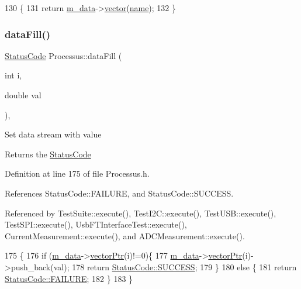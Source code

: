 \begin{DoxyCode}
130                                         \{
131     \textcolor{keywordflow}{return} \hyperlink{classProcessus_a3da9a9de8af54e2f47807a3e09dfccff}{m\_data}->\hyperlink{classData_a94e00cdd58c1d6f11487f1ac47fee4bc}{vector}(\hyperlink{classObject_a300f4c05dd468c7bb8b3c968868443c1}{name});
132   \}
\end{DoxyCode}
\mbox{\label{classProcessus_a0d093b48f3218a088ba030e24372f18c}} 
\subsubsection{\texorpdfstring{data\+Fill()}{dataFill()}\hspace{0.1cm}{\footnotesize\ttfamily [1/2]}}
{\footnotesize\ttfamily \hyperlink{classStatusCode}{Status\+Code} Processus\+::data\+Fill (\begin{DoxyParamCaption}\item[{int}]{i,  }\item[{double}]{val }\end{DoxyParamCaption})\hspace{0.3cm}{\ttfamily [inline]}, {\ttfamily [inherited]}}

Set data stream with value \begin{DoxyReturn}{Returns}
the \hyperlink{classStatusCode}{Status\+Code} 
\end{DoxyReturn}


Definition at line 175 of file Processus.\+h.



References Status\+Code\+::\+F\+A\+I\+L\+U\+RE, and Status\+Code\+::\+S\+U\+C\+C\+E\+SS.



Referenced by Test\+Suite\+::execute(), Test\+I2\+C\+::execute(), Test\+U\+S\+B\+::execute(), Test\+S\+P\+I\+::execute(), Usb\+F\+T\+Interface\+Test\+::execute(), Current\+Measurement\+::execute(), and A\+D\+C\+Measurement\+::execute().


\begin{DoxyCode}
175                                         \{
176     \textcolor{keywordflow}{if} (\hyperlink{classProcessus_a3da9a9de8af54e2f47807a3e09dfccff}{m\_data}->\hyperlink{classData_aa2153cb57f6f1a67b54eafe5582e0b6b}{vectorPtr}(i)!=0)\{
177       \hyperlink{classProcessus_a3da9a9de8af54e2f47807a3e09dfccff}{m\_data}->\hyperlink{classData_aa2153cb57f6f1a67b54eafe5582e0b6b}{vectorPtr}(i)->push\_back(val);
178       \textcolor{keywordflow}{return} \hyperlink{classStatusCode_a6f565cbeadc76d14c72f047e5e85eb4badd0da38d3ba0d922efd1f4619bc37ad8}{StatusCode::SUCCESS};
179     \}
180     \textcolor{keywordflow}{else} \{
181       \textcolor{keywordflow}{return} \hyperlink{classStatusCode_a6f565cbeadc76d14c72f047e5e85eb4ba3da73d4c469762eb9d3c960368252b26}{StatusCode::FAILURE};
182     \}
183   \}
\end{DoxyCode}
\mbox{\label{classProcessus_aa31ab71711f7af6a729441ff573f69c9}} 
